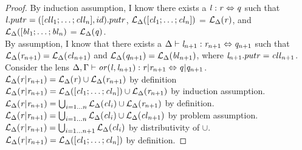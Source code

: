 \begin{lemma}
\begin{proof}
By induction assumption, I know
there exists a $\mathit{l} : \mathit{r} \Leftrightarrow \mathit{q}$ such that
$\mathit{l}.putr = ([\mathit{cll}_1 ; \ldots ; \mathit{cll}_n],id).putr$,
$\mathcal{L}_{\Delta}([\mathit{cl}_1 ; \ldots ; \mathit{cl}_n])$ =
$\mathcal{L}_{\Delta}(\mathit{r})$,
and $\mathcal{L}_{\Delta}([\mathit{bl}_1 ; \ldots ; \mathit{bl}_n)$ = $\mathcal{L}_{\Delta}(\mathit{q})$.\\
By assumption, I know that there exists a $\Delta \vdash \mathit{l}_{n+1} : \mathit{r}_{n+1} \Leftrightarrow \mathit{q}_{n+1}$ such that $\mathcal{L}_{\Delta}(\mathit{r}_{n+1})=\mathcal{L}_{\Delta}(\mathit{cl}_{n+1})$
and $\mathcal{L}_{\Delta}(\mathit{q}_{n+1})=\mathcal{L}_{\Delta}(\mathit{bl}_{n+1})$, where $\mathit{l}_{n+1}.putr=\mathit{cll}_{n+1}$.\\
Consider the lens $\Delta, \Gamma \vdash \mathit{or}(\mathit{l},\mathit{l}_{n+1}) : \mathit{r}|\mathit{r}_{n+1} \Leftrightarrow \mathit{q}|\mathit{q}_{n+1}$.\\
$\mathcal{L}_{\Delta}(\mathit{r}|\mathit{r}_{n+1})
= \mathcal{L}_{\Delta}(\mathit{r})\cup\mathcal{L}_{\Delta}(\mathit{r}_{n+1})$
by definition\\
$\mathcal{L}_{\Delta}(\mathit{r}|\mathit{r}_{n+1})
= \mathcal{L}_{\Delta}([\mathit{cl}_1; \ldots ; \mathit{cl}_n])
\cup\mathcal{L}_{\Delta}(\mathit{r}_{n+1})$ by induction assumption.\\
$\mathcal{L}_{\Delta}(\mathit{r}|\mathit{r}_{n+1})
= \bigcup_{i=1\ldots n}\mathcal{L}_{\Delta}(\mathit{cl}_i)
\cup\mathcal{L}_{\Delta}(\mathit{r}_{n+1})$ by definition.\\
$\mathcal{L}_{\Delta}(\mathit{r}|\mathit{r}_{n+1})
= \bigcup_{i=1\ldots n}\mathcal{L}_{\Delta}(\mathit{cl}_i)
\cup\mathcal{L}_{\Delta}(\mathit{cl}_{n+1})$ by problem assumption.\\
$\mathcal{L}_{\Delta}(\mathit{r}|\mathit{r}_{n+1})
= \bigcup_{i=1\ldots n+1}\mathcal{L}_{\Delta}(\mathit{cl}_i)$ by distributivity of $\cup$.\\
$\mathcal{L}_{\Delta}(\mathit{r}|\mathit{r}_{n+1})
= \mathcal{L}_{\Delta}([\mathit{cl}_1; \ldots ; \mathit{cl}_n])$ by definition.


\end{proof}
\end{lemma}
